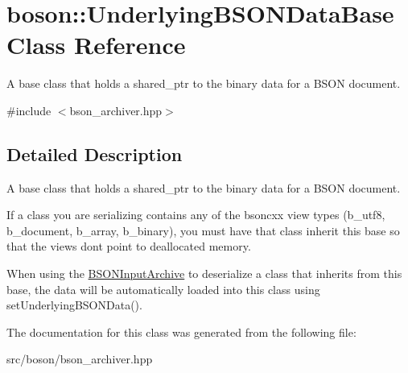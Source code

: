 \hypertarget{classboson_1_1UnderlyingBSONDataBase}{}\section{boson\+:\+:Underlying\+B\+S\+O\+N\+Data\+Base Class Reference}
\label{classboson_1_1UnderlyingBSONDataBase}


A base class that holds a shared\+\_\+ptr to the binary data for a B\+S\+ON document.  




{\ttfamily \#include $<$bson\+\_\+archiver.\+hpp$>$}



\subsection{Detailed Description}
A base class that holds a shared\+\_\+ptr to the binary data for a B\+S\+ON document. 

If a class you are serializing contains any of the bsoncxx view types (b\+\_\+utf8, b\+\_\+document, b\+\_\+array, b\+\_\+binary), you must have that class inherit this base so that the views don\textquotesingle{}t point to deallocated memory.

When using the \hyperlink{classboson_1_1BSONInputArchive}{B\+S\+O\+N\+Input\+Archive} to deserialize a class that inherits from this base, the data will be automatically loaded into this class using set\+Underlying\+B\+S\+O\+N\+Data(). 

The documentation for this class was generated from the following file\+:\begin{DoxyCompactItemize}
\item 
src/boson/bson\+\_\+archiver.\+hpp\end{DoxyCompactItemize}
